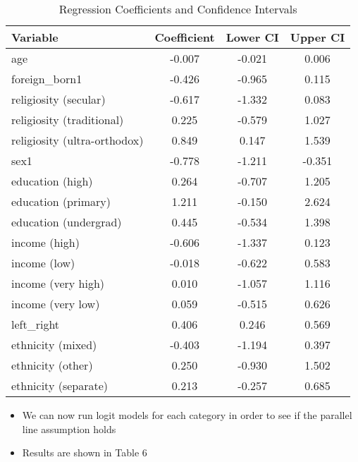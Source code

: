 \documentclass[12pt,letterpaper]{article}
\begin{document}
\begin{table}[!htbp]
	\centering
	\caption{Regression Coefficients and Confidence Intervals}
	\label{tab:coefficients_CI}
	\begin{tabular}{lccc}
		\hline
		Variable & Coefficient & Lower CI & Upper CI \\
		\hline
		age & -0.007 & -0.021 & 0.006 \\
		foreign\_born1 & -0.426 & -0.965 & 0.115 \\
		religiosity (secular) & -0.617 & -1.332 & 0.083 \\
		religiosity (traditional) & 0.225 & -0.579 & 1.027 \\
		religiosity (ultra-orthodox) & 0.849 & 0.147 & 1.539 \\
		sex1 & -0.778 & -1.211 & -0.351 \\
		education (high) & 0.264 & -0.707 & 1.205 \\
		education (primary) & 1.211 & -0.150 & 2.624 \\
		education (undergrad) & 0.445 & -0.534 & 1.398 \\
		income (high) & -0.606 & -1.337 & 0.123 \\
		income (low) & -0.018 & -0.622 & 0.583 \\
		income (very high) & 0.010 & -1.057 & 1.116 \\
		income (very low) & 0.059 & -0.515 & 0.626 \\
		left\_right & 0.406 & 0.246 & 0.569 \\
		ethnicity (mixed) & -0.403 & -1.194 & 0.397 \\
		ethnicity (other) & 0.250 & -0.930 & 1.502 \\
		ethnicity (separate) & 0.213 & -0.257 & 0.685 \\
		\hline
	\end{tabular}
\end{table}

\begin{itemize}
	\item We can now run logit models for each category in order to see if the parallel line assumption holds
	
	\item Results are shown in Table 6
	
\end{itemize}
\end{document}
